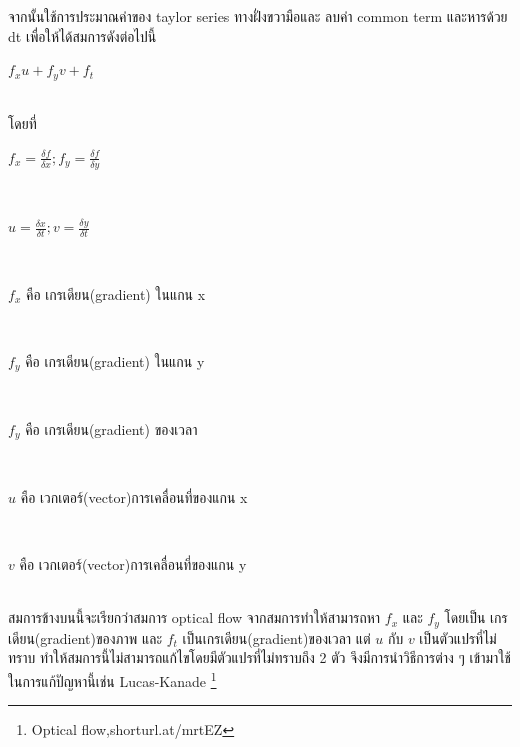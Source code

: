 จากนั้นใช้การประมาณค่าของ taylor series ทางฝั่งขวามือและ ลบค่า common term และหารด้วย dt เพื่อให้ได้สมการดังต่อไปนี้
\\
\centerline{$f_{x}u + f_{y}v + f_{t} $}				\\
โดยที่
\\
\centerline{$f_{x} = \frac{\delta f}{\delta x} ; f_{y} = \frac{\delta f}{\delta y}$} 	\\
\centerline{$u = \frac{\delta x}{\delta t} ; v = \frac{\delta y}{\delta t}$}	 	\\
\centerline{$f_{x}$ คือ เกรเดียน(gradient) ในแกน x} 		\\
\centerline{$f_{y}$ คือ เกรเดียน(gradient) ในแกน y} 		\\
\centerline{$f_{y}$ คือ เกรเดียน(gradient) ของเวลา} 		\\
\centerline{$u$ คือ เวกเตอร์(vector)การเคลื่อนที่ของแกน x} 	\\
\centerline{$v$ คือ เวกเตอร์(vector)การเคลื่อนที่ของแกน y} 	\\

สมการข้างบนนี้จะเรียกว่าสมการ optical flow จากสมการทำให้สามารถหา $f_{x}$ และ $f_{y}$ โดยเป็น เกรเดียน(gradient)ของภาพ และ  $f_{t}$ เป็นเกรเดียน(gradient)ของเวลา แต่ $u$ กับ $v$ เป็นตัวแปรที่ไม่ทราบ ทำให้สมการนี้ไม่สามารถแก้ไขโดยมีตัวแปรที่ไม่ทราบถึง 2 ตัว จึงมีการนำวิธีการต่าง ๆ เข้ามาใช้ในการแก้ปัญหานี้เช่น Lucas-Kanade \footnote{Optical flow,shorturl.at/mrtEZ}

